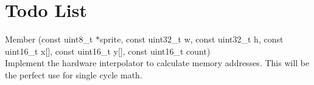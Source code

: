 \chapter{Todo List }
\hypertarget{todo}{}\label{todo}

\begin{DoxyRefList}
\item[Member \doxylink{class_tiny_engine_frame_buffer_aa44092c9eb6d9b0ae8c1edac53c34cbf}{Tiny\+Engine\+Frame\+Buffer\+::draw\+\_\+sprite\+\_\+raw\+\_\+batch} (const uint8\+\_\+t \texorpdfstring{$\ast$}{*}sprite, const uint32\+\_\+t w, const uint32\+\_\+t h, const uint16\+\_\+t x\mbox{[}\mbox{]}, const uint16\+\_\+t y\mbox{[}\mbox{]}, const uint16\+\_\+t count)]\hfill \\
\label{todo__todo000001}%
%
Implement the hardware interpolator to calculate memory addresses. This will be the perfect use for single cycle math.
\end{DoxyRefList}